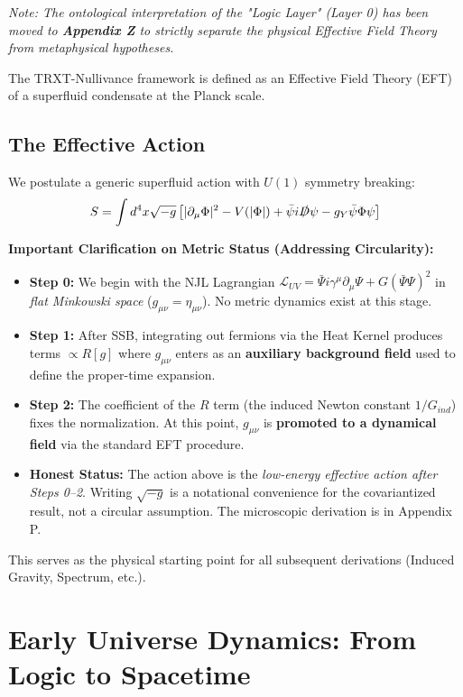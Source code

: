 \documentclass[a4paper,12pt]{article}
\begin{document}
\textit{Note: The ontological interpretation of the "Logic Layer" (Layer 0) has been moved to \textbf{Appendix Z} to strictly separate the physical Effective Field Theory from metaphysical hypotheses.}

The TRXT-Nullivance framework is defined as an Effective Field Theory (EFT) of a superfluid condensate at the Planck scale.
\subsection{The Effective Action}
We postulate a generic superfluid action with $U(1)$ symmetry breaking:
\begin{equation}
    S = \int d^4x \sqrt{-g} \left[ |\partial_\mu \Phi|^2 - V(|\Phi|) + \bar{\psi} i \slashed{D} \psi - g_Y \bar{\psi} \Phi \psi \right]
\end{equation}

\textbf{Important Clarification on Metric Status (Addressing Circularity):}
\begin{itemize}
    \item \textbf{Step 0:} We begin with the NJL Lagrangian $\mathcal{L}_{UV} = \bar{\Psi} i \gamma^\mu \partial_\mu \Psi + G(\bar{\Psi}\Psi)^2$ in \emph{flat Minkowski space} ($g_{\mu\nu} = \eta_{\mu\nu}$). No metric dynamics exist at this stage.
    \item \textbf{Step 1:} After SSB, integrating out fermions via the Heat Kernel produces terms $\propto R[g]$ where $g_{\mu\nu}$ enters as an \textbf{auxiliary background field} used to define the proper-time expansion.
    \item \textbf{Step 2:} The coefficient of the $R$ term (the induced Newton constant $1/G_{ind}$) fixes the normalization. At this point, $g_{\mu\nu}$ is \textbf{promoted to a dynamical field} via the standard EFT procedure.
    \item \textbf{Honest Status:} The action above is the \emph{low-energy effective action after Steps 0--2}. Writing $\sqrt{-g}$ is a notational convenience for the covariantized result, not a circular assumption. The microscopic derivation is in Appendix P.
\end{itemize}
This serves as the physical starting point for all subsequent derivations (Induced Gravity, Spectrum, etc.).
\section{Early Universe Dynamics: From Logic to Spacetime}
\end{document}

